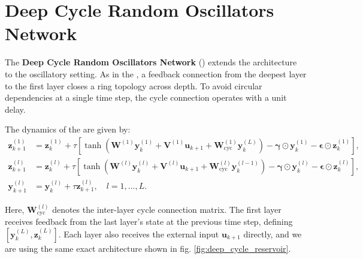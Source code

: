 \section{Deep Cycle Random Oscillators Network}
\label{sec:method:dco}

The \textbf{Deep Cycle Random Oscillators Network} (\DCO) extends the \DCR\@ architecture to the oscillatory setting.
As in the \DCR, a feedback connection from the deepest layer to the first layer closes a ring topology across depth.
To avoid circular dependencies at a single time step, the cycle connection operates with a unit delay.

The dynamics of the \DCO\@ are given by:
\begin{equation}
\label{eq:method:dco_dynamics}
\begin{aligned}
    \mathbf{z}^{(1)}_{k+1} &= \mathbf{z}^{(1)}_k + \tau \left[ \tanh\left(\mathbf{W}^{(1)}\mathbf{y}^{(1)}_k + \mathbf{V}^{(1)}\mathbf{u}_{k+1} + \mathbf{W}_{\text{cyc}}^{(1)}\mathbf{y}^{(L)}_k \right) - \bm{\gamma} \odot \mathbf{y}^{(1)}_k - \bm{\epsilon} \odot \mathbf{z}^{(1)}_k \right], \\
    \mathbf{z}^{(l)}_{k+1} &= \mathbf{z}^{(l)}_k + \tau \left[ \tanh\left(\mathbf{W}^{(l)}\mathbf{y}^{(l)}_k + \mathbf{V}^{(l)}\mathbf{u}_{k+1} + \mathbf{W}_{\text{cyc}}^{(l)}\mathbf{y}^{(l-1)}_k \right) - \bm{\gamma} \odot \mathbf{y}^{(l)}_k - \bm{\epsilon} \odot \mathbf{z}^{(l)}_k \right], \\
    \mathbf{y}^{(l)}_{k+1} &= \mathbf{y}^{(l)}_k + \tau \mathbf{z}^{(l)}_{k+1}, \quad l = 1, \ldots, L.
\end{aligned}
\end{equation}

Here, $\mathbf{W}_{\text{cyc}}^{(l)}$ denotes the inter-layer cycle connection matrix.
The first layer receives feedback from the last layer's state at the previous time step, defining $[\mathbf{y}^{(L)}_k,\mathbf{z}^{(L)}_k]$.
Each layer also receives the external input $\mathbf{u}_{k+1}$ directly, and we are using the same exact architecture shown in fig. \ref{fig:deep_cycle_reservoir}.


